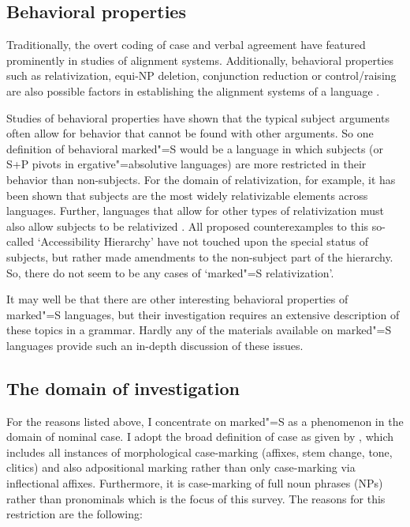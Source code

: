 \subsection{Behavioral properties}\label{behavior} 

Traditionally, the overt coding of case and verbal agreement have featured prominently in studies of alignment systems. 
Additionally, behavioral properties such as relativization, equi-NP deletion, conjunction reduction or control/raising are also possible factors in establishing the alignment systems of a language \citep{Bickel.align}. 

Studies of behavioral properties have shown that the typical subject arguments often allow for behavior that cannot be found with other arguments.
So one definition of behavioral marked"=S would be a language in which subjects (or S+P pivots in ergative"=absolutive languages) are more restricted in their behavior than non-subjects.
For the domain of relativization, for example, it has been shown that subjects are the most widely relativizable elements across languages. 
Further, languages that allow for other types of relativization must also allow subjects to be relativized \citep{Keenan:1977}. 
All proposed counterexamples to this so-called `Accessibility Hierarchy'  have not touched upon the special status of subjects, but rather made amendments to the non-subject part of the hierarchy. 
So, there do not seem to be any cases of `marked"=S relativization'.

It may well be that there are other interesting behavioral properties of marked"=S languages, but their investigation requires an extensive description of these topics in a grammar. Hardly any of the materials available on marked"=S languages provide such an in-depth discussion of these issues. 

\subsection{The domain of investigation}\label{invest}

For the reasons listed above, I concentrate on marked"=S as a phenomenon in the domain of nominal case. 
I adopt the broad definition of case  as given by \citet{Bickel.marking}, which includes all instances of morphological case-marking (affixes, stem change, tone, clitics) and also adpositional marking rather than only case-marking via inflectional affixes.
Furthermore, it is case-marking of full noun phrases (NPs) rather than pronominals which is the focus of this survey. 
The reasons for this restriction  are the following:

